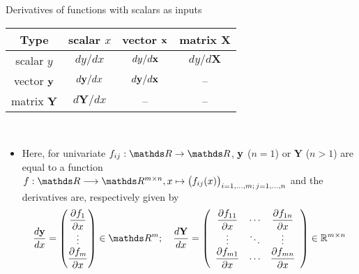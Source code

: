 \documentclass[11pt,compress,t,notes=noshow, xcolor=table]{beamer}
\newcommand{\deriv}{d}
\begin{document}
\begin{vbframe}{Derivatives of functions with scalars as inputs}
        \begin{table}
            \centering
            \begin{tabular}{c||c|c|c}
                 Type & scalar $x$ & vector $\mathbf{x}$ & matrix $\mathbf{X}$ \\ \hline\hline
                 scalar $y$ & $\deriv y / \deriv x$ & $\deriv y / \deriv\xv$ & $\deriv y / \deriv\mathbf{X}$ \\ \hline
                 vector $\mathbf{y}$ & \cellcolor{customblue}$\deriv\yv / \deriv x$ & $\deriv\yv / \deriv\xv$ & -- \\ \hline
                 matrix $\mathbf{Y}$ & \cellcolor{customblue}$\deriv\mathbf{Y} / \deriv x$ & -- & --
            \end{tabular}
        \end{table}\,\\
        \begin{itemize}
        \item  Here, for univariate $f_{ij}:\R\rightarrow\R$, $\mathbf{y}$ ($n=1$) or $\mathbf{Y}$ ($n>1$) are equal to a function $f: \R\longrightarrow\R^{m\times n}, x\mapsto \big(f_{ij}(x)\big)_{i=1,\dots,m;\,j=1,\dots,n}$ and the derivatives are, respectively given by $$
        \frac{\deriv\yv}{\deriv x}=\begin{pmatrix}
            \dfrac{\partial f_{1}}{\partial x}\\\vdots\\ \dfrac{\partial f_{m}}{\partial x}
        \end{pmatrix}\in\R^m;\quad
        \frac{\deriv\mathbf{Y}}{\deriv x}=\left(\begin{array}{ccc}
\dfrac{\partial f_{11}}{\partial x} & \cdots & \dfrac{\partial f_{1 n}}{\partial x} \\
\vdots & \ddots & \vdots \\
\dfrac{\partial f_{m 1}}{\partial x} & \cdots & \dfrac{\partial f_{m n}}{\partial x}
\end{array}\right) \in \mathbb{R}^{m \times n}$$
        \end{itemize}
\end{vbframe}
\end{document}

